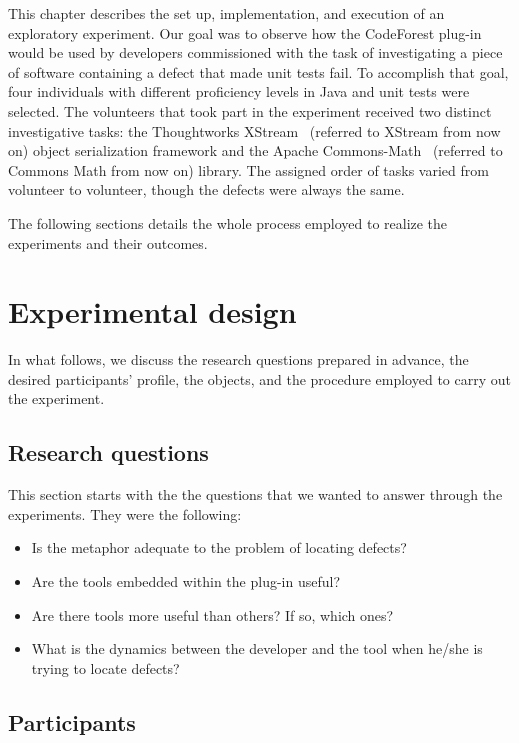 This chapter describes the set up, implementation, and execution of an
exploratory experiment. Our goal was to observe how the CodeForest plug-in would
be used by developers commissioned with the task of investigating a piece of
software containing a defect that made unit tests fail.
To accomplish that goal, four individuals with different proficiency levels in
Java and unit tests were selected.
The volunteers that took part in the experiment received two distinct
investigative tasks: the Thoughtworks XStream~\cite{walnes2005xstream} (referred
to XStream from now on) object serialization framework and the Apache
Commons-Math~\cite{commons2013math} (referred to Commons Math from now on)
library. The assigned order of tasks varied from volunteer to volunteer, though
the defects were always the same.

The following sections details the whole process employed to realize the
experiments and their outcomes.

\section{Experimental design}

In what follows, we discuss the research questions prepared in advance,
the desired participants' profile, the objects, and the procedure employed to
carry out the experiment.

\subsection{Research questions}

This section starts with the the questions that we wanted to answer through the
experiments. They were the following:
\begin{itemize}
  \item Is the metaphor adequate to the problem of locating defects?
  \item Are the tools embedded within the plug-in useful?
  \item Are there tools more useful than others? If so, which ones?
  \item What is the dynamics between the developer and the tool when he/she
  is trying to locate defects?
\end{itemize}

\subsection{Participants}

